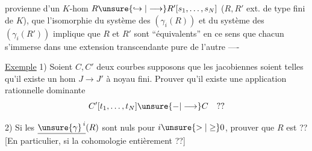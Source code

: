 provienne d'un $K$-hom
$R\unsure{\hookrightarrow|\longrightarrow}R'[s_1,\ldots,s_N]$
($R,R'$ ext. de type fini de $K$),
que l'isomorphie du système des
$(\gamma_i(R))$ et du système des $(\gamma_i(R'))$
implique que $R$ et $R'$ sont ``équivalents''
en ce sens que chacun s'immerse
dans une extension transcendante pure
de l'autre ----

\uline{Exemple} 1) Soient $C,C'$ deux courbes
supposons que les jacobiennes soient telles
qu'il existe un hom $J\to J'$ à
noyau fini. Prouver qu'il existe
 une application rationnelle dominante
\[
C'[t_1,\ldots,t_N]\unsure{-|\longrightarrow}C\quad ??
\]

2) Si les $\underline{\unsure{\gamma}^{\,i}}(R)$ sont nuls pour
$i\unsure{>|\geq}0$,
prouver que $R$ est  ??
[En particulier, si la cohomologie
entièrement  ??]

